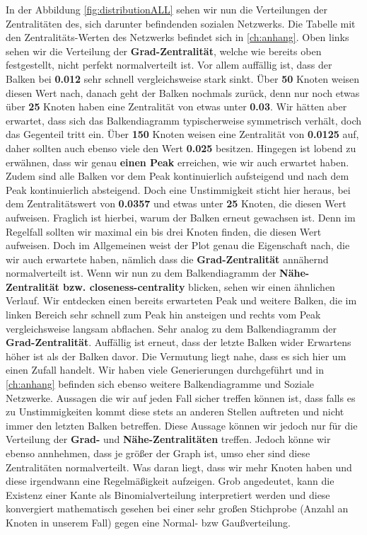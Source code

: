 In der Abbildung \ref{fig:distributionALL} sehen wir nun die Verteilungen der Zentralitäten des, sich darunter befindenden sozialen Netzwerks. Die Tabelle mit den Zentralitäts-Werten des Netzwerks befindet sich in \ref{ch:anhang}. Oben links sehen wir die Verteilung der \textbf{Grad-Zentralität}, welche wie bereits oben festgestellt, nicht perfekt normalverteilt ist. Vor allem auffällig ist, dass der Balken bei \textbf{0.012} sehr schnell vergleichsweise stark sinkt. Über \textbf{50} Knoten weisen diesen Wert nach, danach geht der Balken nochmals zurück, denn nur noch etwas über \textbf{25} Knoten haben eine Zentralität von etwas unter \textbf{0.03}. Wir hätten aber erwartet, dass sich das Balkendiagramm typischerweise symmetrisch verhält, doch das Gegenteil tritt ein. Über \textbf{150} Knoten weisen eine Zentralität von \textbf{0.0125} auf, daher sollten auch ebenso viele den Wert \textbf{0.025} besitzen. Hingegen ist lobend zu erwähnen, dass wir genau \textbf{einen Peak} erreichen, wie wir auch erwartet haben. Zudem sind alle Balken vor dem Peak kontinuierlich aufsteigend und nach dem Peak kontinuierlich absteigend. Doch eine Unstimmigkeit sticht hier heraus, bei dem Zentralitätswert von \textbf{0.0357} und etwas unter \textbf{25} Knoten, die diesen Wert aufweisen. Fraglich ist hierbei, warum der Balken erneut gewachsen ist. Denn im Regelfall sollten wir maximal ein bis drei Knoten finden, die diesen Wert aufweisen. Doch im Allgemeinen weist der Plot genau die Eigenschaft nach, die wir auch erwartete haben, nämlich dass die \textbf{Grad-Zentralität} annähernd normalverteilt ist. Wenn wir nun zu dem Balkendiagramm der \textbf{Nähe-Zentralität bzw. closeness-centrality} blicken, sehen wir einen ähnlichen Verlauf. Wir entdecken einen bereits erwarteten Peak und weitere Balken, die im linken Bereich sehr schnell zum Peak hin ansteigen und rechts vom Peak vergleichsweise langsam abflachen. Sehr analog zu dem Balkendiagramm der \textbf{Grad-Zentralität}. Auffällig ist erneut, dass der letzte Balken wider Erwartens höher ist als der Balken davor. Die Vermutung liegt nahe, dass es sich hier um einen Zufall handelt. Wir haben viele Generierungen durchgeführt und in \ref{ch:anhang} befinden sich ebenso weitere Balkendiagramme und Soziale Netzwerke. Aussagen die wir auf jeden Fall sicher treffen können ist, dass falls es zu Unstimmigkeiten kommt diese stets an anderen Stellen auftreten und nicht immer den letzten Balken betreffen. Diese Aussage können wir jedoch nur für die Verteilung der \textbf{Grad-} und \textbf{Nähe-Zentralitäten} treffen. Jedoch könne wir ebenso annhehmen, dass je größer der Graph ist, umso eher sind diese Zentralitäten normalverteilt. Was daran liegt, dass wir mehr Knoten haben und diese irgendwann eine Regelmäßigkeit aufzeigen. Grob angedeutet, kann die Existenz einer Kante als Binomialverteilung interpretiert werden und diese konvergiert mathematisch gesehen bei einer sehr großen Stichprobe (Anzahl an Knoten in unserem Fall) gegen eine Normal- bzw Gaußverteilung.
